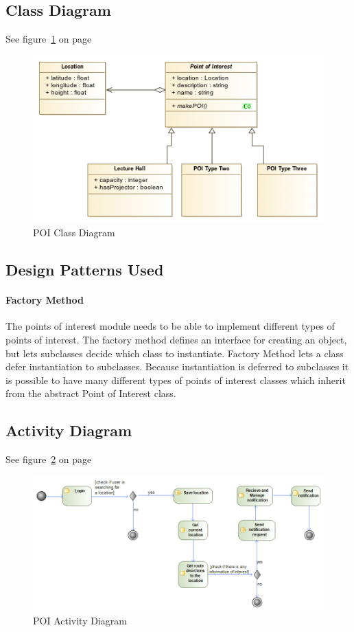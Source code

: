 \subsection{Class Diagram}
See figure~\ref{fig:POI_Class_Diagram} on page~\pageref{fig:POI_Class_Diagram}
\begin{figure}
	\centering
	\includegraphics[scale=0.54]{POI/poi_class_diagram.png}
	\caption{POI Class Diagram}
	\label{fig:POI_Class_Diagram}
\end{figure}

\subsection{Design Patterns Used}
    \paragraph{Factory Method}
    The points of interest module needs to be able to implement different types of points of interest. The factory method defines an interface for creating an object, but lets subclasses decide which class to instantiate. Factory Method lets a class defer instantiation to subclasses. Because instantiation is deferred to subclasses it is possible to have many different types of points of interest classes which inherit from the abstract Point of Interest class.
 
 \subsection{Activity Diagram}
See figure~\ref{fig:POI_Activity_Diagram} on page~\pageref{fig:POI_Activity_Diagram}
\begin{figure}
	\centering
	\includegraphics[scale=0.54]{POI/poi_activity_diagram.png}
	\caption{POI Activity Diagram}
	\label{fig:POI_Activity_Diagram}
\end{figure}

